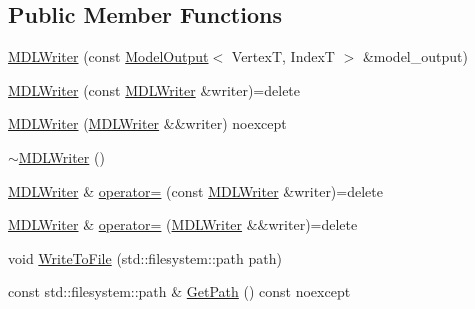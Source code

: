 \subsection*{Public Member Functions}
\begin{DoxyCompactItemize}
\item 
\mbox{\hyperlink{classmage_1_1rendering_1_1loader_1_1_m_d_l_writer_a6b30e49f08b5c6cd4702f5fdecd17561}{M\+D\+L\+Writer}} (const \mbox{\hyperlink{structmage_1_1rendering_1_1_model_output}{Model\+Output}}$<$ VertexT, IndexT $>$ \&model\+\_\+output)
\item 
\mbox{\hyperlink{classmage_1_1rendering_1_1loader_1_1_m_d_l_writer_a475ff3efdba707303052bae28d3ba85b}{M\+D\+L\+Writer}} (const \mbox{\hyperlink{classmage_1_1rendering_1_1loader_1_1_m_d_l_writer}{M\+D\+L\+Writer}} \&writer)=delete
\item 
\mbox{\hyperlink{classmage_1_1rendering_1_1loader_1_1_m_d_l_writer_a27f71b3a27f96e263948d19b8b570309}{M\+D\+L\+Writer}} (\mbox{\hyperlink{classmage_1_1rendering_1_1loader_1_1_m_d_l_writer}{M\+D\+L\+Writer}} \&\&writer) noexcept
\item 
\mbox{\hyperlink{classmage_1_1rendering_1_1loader_1_1_m_d_l_writer_aaa0fb8c60dee5352ed467bfb3f283f43}{$\sim$\+M\+D\+L\+Writer}} ()
\item 
\mbox{\hyperlink{classmage_1_1rendering_1_1loader_1_1_m_d_l_writer}{M\+D\+L\+Writer}} \& \mbox{\hyperlink{classmage_1_1rendering_1_1loader_1_1_m_d_l_writer_a9e5f38a8b5016534385039d44d3d71dc}{operator=}} (const \mbox{\hyperlink{classmage_1_1rendering_1_1loader_1_1_m_d_l_writer}{M\+D\+L\+Writer}} \&writer)=delete
\item 
\mbox{\hyperlink{classmage_1_1rendering_1_1loader_1_1_m_d_l_writer}{M\+D\+L\+Writer}} \& \mbox{\hyperlink{classmage_1_1rendering_1_1loader_1_1_m_d_l_writer_aaa2a3f4e8025bffefefaae7d3ef018f0}{operator=}} (\mbox{\hyperlink{classmage_1_1rendering_1_1loader_1_1_m_d_l_writer}{M\+D\+L\+Writer}} \&\&writer)=delete
\item 
void \mbox{\hyperlink{classmage_1_1rendering_1_1loader_1_1_m_d_l_writer_ac01e930b55888da88e345b0910d4b1c2}{Write\+To\+File}} (std\+::filesystem\+::path path)
\item 
const std\+::filesystem\+::path \& \mbox{\hyperlink{classmage_1_1rendering_1_1loader_1_1_m_d_l_writer_ab023ae8174132f233c6e1fa4d3a2a1c8}{Get\+Path}} () const noexcept
\end{DoxyCompactItemize}
